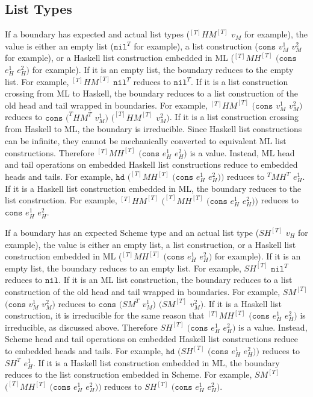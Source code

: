 \subsection{List Types}

If a boundary has expected and actual list types ($^{[T]}HM^{[T]}$ $v_{M}$ for example), the value is either an empty list ($\mathtt{nil}^{T}$ for example), a list construction ($\mathtt{cons}$ $v_{M}^{1}$ $v_{M}^{2}$ for example), or a Haskell list construction embedded in ML ($^{[T]}MH^{[T]}$ $(\mathtt{cons}$ $e_{H}^{1}$ $e_{H}^{2})$ for example).  If it is an empty list, the boundary reduces to the empty list.  For example, $^{[T]}HM^{[T]}$ $\mathtt{nil}^{T}$ reduces to $\mathtt{nil}^{T}$.  If it is a list construction crossing from ML to Haskell, the boundary reduces to a list construction of the old head and tail wrapped in boundaries.  For example, $^{[T]}HM^{[T]}$ $(\mathtt{cons}$ $v_{M}^{1}$ $v_{M}^{2})$ reduces to $\mathtt{cons}$ $(^{T}HM^{T}$ $v_{M}^{1})$ $(^{[T]}HM^{[T]}$ $v_{M}^{2})$.  If it is a list construction crossing from Haskell to ML, the boundary is irreducible.  Since Haskell list constructions can be infinite, they cannot be mechanically converted to equivalent ML list constructions.  Therefore $^{[T]}MH^{[T]}$ $(\mathtt{cons}$ $e_{H}^{1}$ $e_{H}^{2})$ is a value.  Instead, ML head and tail operations on embedded Haskell list constructions reduce to embedded heads and tails.  For example, $\mathtt{hd}$ $(^{[T]}MH^{[T]}$ $(\mathtt{cons}$ $e_{H}^{1}$ $e_{H}^{2}))$ reduces to $^{T}MH^{T}$ $e_{H}^{1}$.  If it is a Haskell list construction embedded in ML, the boundary reduces to the list construction.  For example, $^{[T]}HM^{[T]}$ $(^{[T]}MH^{[T]}$ $(\mathtt{cons}$ $e_{H}^{1}$ $e_{H}^{2}))$ reduces to $\mathtt{cons}$ $e_{H}^{1}$ $e_{H}^{2}$.

If a boundary has an expected Scheme type and an actual list type ($SH^{[T]}$ $v_{H}$ for example), the value is either an empty list, a list construction, or a Haskell list construction embedded in ML ($^{[T]}MH^{[T]}$ $(\mathtt{cons}$ $e_{H}^{1}$ $e_{H}^{2})$ for example).  If it is an empty list, the boundary reduces to an empty list.  For example, $SH^{[T]}$ $\mathtt{nil}^{T}$ reduces to $\mathtt{nil}$.  If it is an ML list construction, the boundary reduces to a list construction of the old head and tail wrapped in boundaries.  For example, $SM^{[T]}$ $(\mathtt{cons}$ $v_{M}^{1}$ $v_{M}^{2})$ reduces to $\mathtt{cons}$ $(SM^{T}$ $v_{M}^{1})$ $(SM^{[T]}$ $v_{M}^{2})$.  If it is a Haskell list construction, it is irreducible for the same reason that $^{[T]}MH^{[T]}$ $(\mathtt{cons}$ $e_{H}^{1}$ $e_{H}^{2})$ is irreducible, as discussed above.  Therefore $SH^{[T]}$ $(\mathtt{cons}$ $e_{H}^{1}$ $e_{H}^{2})$ is a value.  Instead, Scheme head and tail operations on embedded Haskell list constructions reduce to embedded heads and tails.  For example, $\mathtt{hd}$ $(SH^{[T]}$ $(\mathtt{cons}$ $e_{H}^{1}$ $e_{H}^{2}))$ reduces to $SH^{T}$ $e_{H}^{1}$.  If it is a Haskell list construction embedded in ML, the boundary reduces to the list construction embedded in Scheme.  For example, $SM^{[T]}$ $(^{[T]}MH^{[T]}$ $(\mathtt{cons}$ $e_{H}^{1}$ $e_{H}^{2}))$ reduces to $SH^{[T]}$ $(\mathtt{cons}$ $e_{H}^{1}$ $e_{H}^{2})$.

